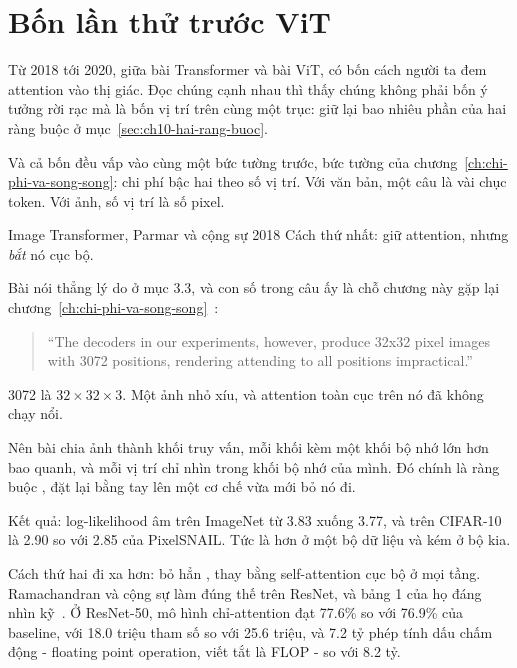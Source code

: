 \section{Bốn lần thử trước ViT}
\label{sec:ch10-truoc-vit}

%
Từ 2018 tới 2020, giữa bài Transformer và bài ViT, có bốn cách người ta đem
attention vào thị giác. Đọc chúng cạnh nhau thì thấy chúng không phải bốn ý
tưởng rời rạc mà là bốn vị trí trên cùng một trục: giữ lại bao nhiêu phần của
hai ràng buộc ở mục~\ref{sec:ch10-hai-rang-buoc}.

Và cả bốn đều vấp vào cùng một bức tường trước, bức tường của
chương~\ref{ch:chi-phi-va-song-song}: chi phí bậc hai theo số vị trí. Với văn
bản, một câu là vài chục token. Với ảnh, số vị trí là số pixel.

\begin{bridge}{Image Transformer, Parmar và cộng sự 2018}
Cách thứ nhất: giữ attention, nhưng \emph{bắt} nó cục bộ.

Bài nói thẳng lý do ở mục 3.3, và con số trong câu ấy là chỗ chương này gặp lại
chương~\ref{ch:chi-phi-va-song-song}~\autocite{parmar2018image}:

\begin{quote}
\enquote{The decoders in our experiments, however, produce 32x32 pixel images
with 3072 positions, rendering attending to all positions impractical.}
\end{quote}

3072 là \(32 \times 32 \times 3\). Một ảnh nhỏ xíu, và attention toàn cục trên
nó đã không chạy nổi.

Nên bài chia ảnh thành khối truy vấn, mỗi khối kèm một khối bộ nhớ lớn hơn bao
quanh, và mỗi vị trí chỉ nhìn trong khối bộ nhớ của mình. Đó chính là ràng buộc
, đặt lại bằng tay lên một cơ chế vừa mới bỏ nó đi.

Kết quả: log-likelihood âm trên ImageNet từ 3.83 xuống 3.77, và trên CIFAR-10
là 2.90 so với 2.85 của PixelSNAIL. Tức là hơn ở một bộ dữ liệu và kém ở bộ
kia.
\end{bridge}

Cách thứ hai đi xa hơn: bỏ hẳn , thay bằng
self-attention cục bộ ở mọi tầng. Ramachandran và cộng sự làm đúng thế trên ResNet, và bảng 1 của họ đáng
nhìn kỹ~\autocite{ramachandran2019standalone}. Ở ResNet-50, mô hình chỉ-attention
đạt 77.6\% so với 76.9\% của baseline, với 18.0 triệu tham số so với 25.6
triệu, và 7.2 tỷ phép tính dấu chấm động - floating point operation, viết tắt
là FLOP - so với 8.2 tỷ.

